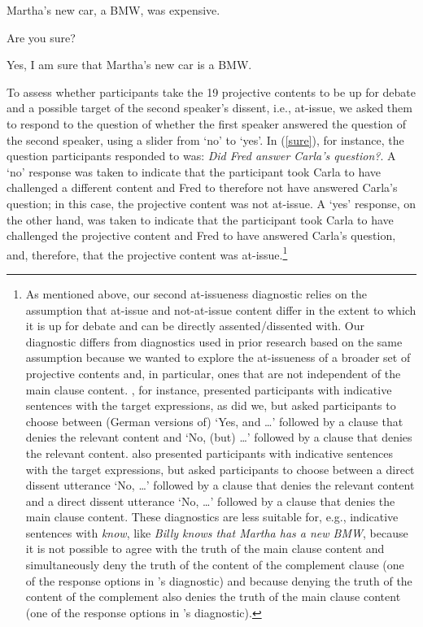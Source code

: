 \documentclass[11pt,fleqn]{article}
\newcommand{\6}{\mbox{$[\hspace*{-.6mm}[$}}
\newcommand{\9}{\mbox{$]\hspace*{-.6mm}]$}}
\newcommand{\citepos}[1]{\citeauthor{#1}'s \citeyear{#1}}
\begin{document}
\begin{exe}
\ex\label{sure} 
\begin{xlist}
 Martha’s new car, a BMW, was expensive.

 Are you sure?

 Yes, I am sure that Martha's new car is a BMW.
\end{xlist}
\end{exe}
To assess whether participants take the 19 projective contents to be up for debate and a possible target of the second speaker's dissent, i.e., at-issue, we asked them to respond to the question of whether the first speaker answered the question of the second speaker, using a slider from `no' to `yes'. In (\ref{sure}), for instance, the question participants responded to was: {\em Did Fred answer Carla's question?}. A `no' response was taken to indicate that the participant took Carla to have challenged a different content and Fred to therefore not have answered Carla's question; in this case, the projective content was not at-issue. A `yes' response, on the other hand, was taken to indicate that the participant took Carla to have challenged the projective content and Fred to have answered Carla's question, and, therefore, that the projective content was at-issue.\footnote{As mentioned above, our second at-issueness diagnostic relies on the assumption that at-issue and not-at-issue content differ in the extent to which it is up for debate and can be directly assented/dissented with. Our diagnostic differs from diagnostics used in prior research based on the same assumption because we wanted to explore the at-issueness of a broader set of projective contents and, in particular, ones that are not independent of the main clause content.  \citet{xue-onea11}, for instance, presented participants with indicative sentences with the target expressions, as did we, but asked participants to choose between (German versions of) `Yes, and \ldots' followed by a clause that denies the relevant content and `No, (but) \ldots' followed by a clause that denies the relevant content.  \citet{syrett-koev2015} also presented participants with indicative sentences with the target expressions, but asked participants to choose between a direct dissent utterance `No, \ldots' followed by a clause that denies the relevant content and a direct dissent utterance `No, \ldots' followed by a clause that denies the main clause content. These diagnostics are less suitable for, e.g., indicative sentences with {\em know}, like {\em Billy knows that Martha has a new BMW}, because it is not possible to agree with the truth of the main clause content and simultaneously deny the truth of the content of the complement clause (one of the response options in \citepos{xue-onea11} diagnostic) and because denying the truth of the content of the complement also denies the truth of the main clause content (one of the response options in \citepos{syrett-koev2015} diagnostic).}
\end{document}
